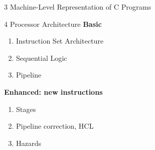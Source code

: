 \documentclass{beamer}
\begin{document}
\begin{frame}{3 Machine-Level Representation of C Programs}
	\only<1> {
	}
	 {
	}
\end{frame}

\begin{frame}{4 Processor Architecture}
\textbf{Basic}
\begin{enumerate}
	\item Instruction Set Architecture
	\item Sequential Logic
	\item Pipeline
\end{enumerate}
\textbf{Enhanced: new instructions}
\begin{enumerate}
	\item Stages
	\item Pipeline correction, HCL
	\item Hazards
\end{enumerate}
\end{frame}
\end{document}
